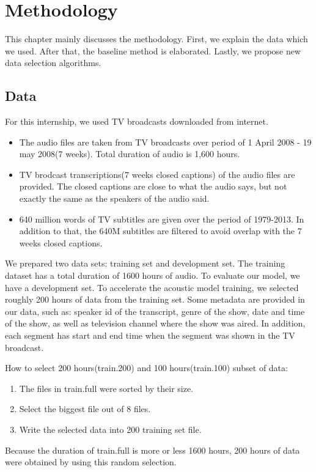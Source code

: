 \chapter{Methodology}
This chapter mainly discusses the methodology. First, we explain the data which we used. After that, the baseline method is elaborated. Lastly, we propose new data selection algorithms.

\section{Data}
For this internship, we used TV broadcasts downloaded from internet. 
\begin{itemize}
\item The audio files are taken from TV broadcasts over period of 1 April 2008 - 19 may 2008(7 weeks). Total duration of audio is 1,600 hours.
\item TV brodcast transcriptions(7 weeks closed captions) of the audio files are provided. The closed captions are close to what the audio says, but not exactly the same as the speakers of the audio said.
\item 640 million words of TV subtitles are given over the period of 1979-2013. In addition to that, the 640M subtitles are filtered to avoid overlap with the 7 weeks closed captions.
\end{itemize} 

We prepared two data sets: training set and development set. The training dataset has a total duration of 1600 hours of audio. To evaluate our model, we have a development set. To accelerate the acoustic model training,  we selected roughly 200 hours of data from the training set. Some metadata are provided in our data, such as: speaker id of the transcript, genre of the show, date and time of the show, as well as television channel where the show was aired. In addition, each segment has start and end time when the segment was shown in the TV broadcast. 

How to select 200 hours(train.200) and 100 hours(train.100) subset of data: 
\begin{enumerate}
\item The files in train.full were sorted by their size.
\item Select the biggest file out of 8 files.
\item Write the selected data into 200 training set file.
\end{enumerate}
Because the duration of train.full is more or less 1600 hours, 200 hours of data were obtained by using this random selection. 

